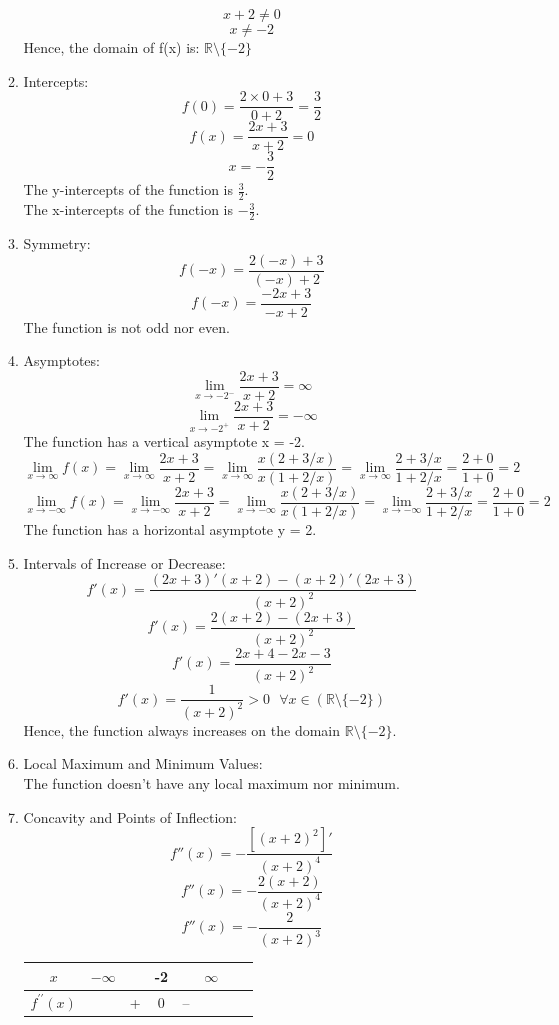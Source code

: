 \documentclass[12pt]{article}
\begin{document}
\begin{enumerate}
\begin{enumerate}
            \[x + 2 \neq 0\]
            \[x \neq -2\]
        Hence, the domain of f(x) is: $\mathds{R} \setminus \{-2\}$ 
        \item Intercepts:
            \[f(0) = \frac{2\times 0 + 3}{0 + 2} = \frac{3}{2}\]
            \[f(x) = \frac{2x+3}{x+2} = 0\]
            \[x = -\frac{3}{2}\]
            The y-intercepts of the function is $\frac{3}{2}$.\\
            The x-intercepts of the function is $-\frac{3}{2}$.
        \item Symmetry:
            \[f(-x) = \frac{2(-x)+3}{(-x)+2}\]
            \[f(-x) = \frac{-2x+3}{-x+2}\]
            The function is not odd nor even.
        \item Asymptotes:
            \[\lim_{x \to -2^-} \frac{2x+3}{x+2} = \infty\] 
            \[\lim_{x \to -2^+} \frac{2x+3}{x+2} = -\infty\] 
            The function has a vertical asymptote x = -2.
            \[\lim_{x \to \infty} f(x) = \lim_{x \to \infty} \frac{2x+3}{x+2} = \lim_{x \to \infty} \frac{x(2+3/x)}{x(1+2/x)} 
            = \lim_{x \to \infty} \frac{2+3/x}{1+2/x} = \frac{2 + 0}{1 + 0} = 2\]
            \[\lim_{x \to -\infty} f(x) = \lim_{x \to -\infty} \frac{2x+3}{x+2} = \lim_{x \to -\infty} \frac{x(2+3/x)}{x(1+2/x)} = \lim_{x \to -\infty} \frac{2+3/x}{1+2/x} = \frac{2 + 0}{1 + 0} = 2\]
            The function has a horizontal asymptote y = 2.
        \item Intervals of Increase or Decrease:
            \[f'(x) = \frac{(2x+3)'(x+2)-(x+2)'(2x+3)}{(x+2)^2}\]
            \[f'(x) = \frac{2(x+2)-(2x+3)}{(x+2)^2}\]
            \[f'(x) = \frac{2x+4-2x-3}{(x+2)^2}\]
            \[f'(x) = \frac{1}{(x+2)^2} > 0 \text{ } \forall x \in (\mathds{R} \setminus \{-2\}) \]
            Hence, the function always increases on the domain $\mathds{R} \setminus \{-2\}$.
        \item Local Maximum and Minimum Values:\\
            The function doesn't have any local maximum nor minimum.
        \item Concavity and Points of Inflection:
            \[f''(x) = -\frac{[(x+2)^2]'}{(x+2)^4}\]
            \[f''(x) = -\frac{2(x+2)}{(x+2)^4}\]
            \[f''(x) = -\frac{2}{(x+2)^3}\]
            \begin{center}
                \begin{tabular}{c c c c c c c c}
                    $x$ & $-\infty$ & ~ & -2 & ~ & $\infty$ \\ 
                    \hline 
                    $f^{\prime\prime} (x)$ & ~ & + & 0 & -- \\ 

\end{tabular}
\end{center}
\end{enumerate}
\end{enumerate}
\end{document}

